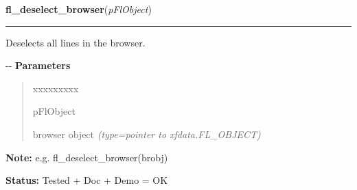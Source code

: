 \hspace{.8\funcindent}\begin{boxedminipage}{\funcwidth}

    \raggedright \textbf{fl\_deselect\_browser}(\textit{pFlObject})

    \vspace{-1.5ex}

    \rule{\textwidth}{0.5\fboxrule}
\setlength{\parskip}{2ex}

Deselects all lines in the browser.

-{}-
\setlength{\parskip}{1ex}
      \textbf{Parameters}
      \vspace{-1ex}

      \begin{quote}
        \begin{Ventry}{xxxxxxxxx}

          \item[pFlObject]


browser object
            {\it (type=pointer to xfdata.FL\_OBJECT)}

        \end{Ventry}

      \end{quote}

\textbf{Note:} 
e.g. fl\_deselect\_browser(brobj)


\textbf{Status:} 
Tested + Doc + Demo = OK


    \end{boxedminipage}

    \label{xformslib:flbrowser:fl_isselected_browser_line}

    \vspace{0.5ex}

